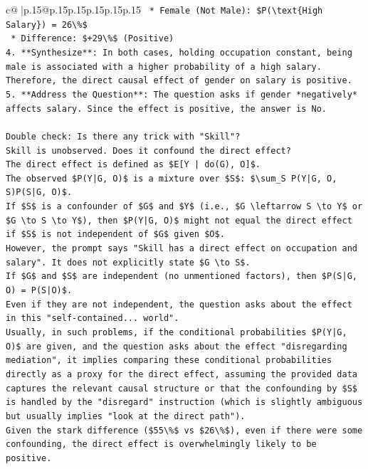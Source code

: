 \documentclass{article}
\begin{document}
{\begin{supertabular}{c@{$\;$}|p{.15\linewidth}@{}p{.15\linewidth}p{.15\linewidth}p{.15\linewidth}p{.15\linewidth}p{.15\linewidth}}
{{{\texttt{        *   Female (Not Male): \$P(\textbackslash{}text\{High Salary\}) = 26\textbackslash{}\%\$} \\
\texttt{        *   Difference: \$+29\textbackslash{}\%\$ (Positive)} \\
\texttt{4.  **Synthesize**: In both cases, holding occupation constant, being male is associated with a higher probability of a high salary. Therefore, the direct causal effect of gender on salary is positive.} \\
\texttt{5.  **Address the Question**: The question asks if gender *negatively* affects salary. Since the effect is positive, the answer is No.} \\
\\ 
\texttt{Double check: Is there any trick with "Skill"?} \\
\texttt{Skill is unobserved. Does it confound the direct effect?} \\
\texttt{The direct effect is defined as \$E{[}Y | do(G), O{]}\$.} \\
\texttt{The observed \$P(Y|G, O)\$ is a mixture over \$S\$: \$\textbackslash{}sum\_S P(Y|G, O, S)P(S|G, O)\$.} \\
\texttt{If \$S\$ is a confounder of \$G\$ and \$Y\$ (i.e., \$G \textbackslash{}leftarrow S \textbackslash{}to Y\$ or \$G \textbackslash{}to S \textbackslash{}to Y\$), then \$P(Y|G, O)\$ might not equal the direct effect if \$S\$ is not independent of \$G\$ given \$O\$.} \\
\texttt{However, the prompt says "Skill has a direct effect on occupation and salary". It does not explicitly state \$G \textbackslash{}to S\$.} \\
\texttt{If \$G\$ and \$S\$ are independent (no unmentioned factors), then \$P(S|G, O) = P(S|O)\$.} \\
\texttt{Even if they are not independent, the question asks about the effect in this "self{-}contained... world".} \\
\texttt{Usually, in such problems, if the conditional probabilities \$P(Y|G, O)\$ are given, and the question asks about the effect "disregarding mediation", it implies comparing these conditional probabilities directly as a proxy for the direct effect, assuming the provided data captures the relevant causal structure or that the confounding by \$S\$ is handled by the "disregard" instruction (which is slightly ambiguous but usually implies "look at the direct path").} \\
\texttt{Given the stark difference (\$55\textbackslash{}\%\$ vs \$26\textbackslash{}\%\$), even if there were some confounding, the direct effect is overwhelmingly likely to be positive.} \\
}}}
\end{supertabular}}
\end{document}
